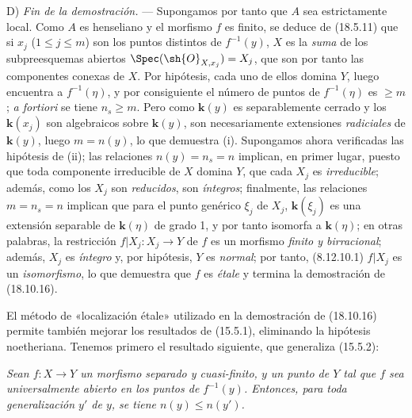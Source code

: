 D) \emph{Fin de la demostración.} --- Supongamos por tanto que $A$ sea estrictamente local. Como $A$ es henseliano y el morfismo $f$ es finito, se deduce de (18.5.11) que si $x_j$ ($1\leq j\leq m$) son los puntos distintos de $f^{-1}(y)$, $X$ es la \emph{suma} de los subpreesquemas abiertos $\Spec(\sh{O}_{X,x_j})=X_j$, que son por tanto las componentes conexas de $X$. Por hipótesis, cada uno de ellos domina $Y$, luego encuentra a $f^{-1}(\eta)$, y por consiguiente el número de puntos de $f^{-1}(\eta)$ es $\geq m$; \emph{a fortiori} se tiene $n_s\geq m$. Pero como $\boldsymbol k(y)$ es separablemente cerrado y los $\boldsymbol k(x_j)$ son algebraicos sobre $\boldsymbol k(y)$, son necesariamente extensiones \emph{radiciales} de $\boldsymbol k(y)$, luego $m=n(y)$, lo que demuestra (i). Supongamos ahora verificadas las hipótesis de (ii); las relaciones $n(y)=n_s=n$ implican, en primer lugar, puesto que toda componente irreducible de $X$ domina $Y$, que cada $X_j$ es \emph{irreducible}; además, como los $X_j$ son \emph{reducidos}, son \emph{íntegros}; finalmente, las relaciones $m=n_s=n$ implican que para el punto genérico $\xi_j$ de $X_j$, $\boldsymbol k(\xi_j)$ es una extensión separable de $\boldsymbol k(\eta)$ de grado 1, y por tanto isomorfa a $\boldsymbol k(\eta)$; en otras palabras, la restricción $f|X_j:X_j\to Y$ de $f$ es un morfismo \emph{finito y birracional}; además, $X_j$ es \emph{íntegro} y, por hipótesis, $Y$ es \emph{normal}; por tanto, (8.12.10.1) $f|X_j$ es un \emph{isomorfismo}, lo que demuestra que $f$ es \emph{étale} y termina la demostración de (18.10.16).

\begin{remark}[18.10.17]
\label{IV.18.10.17}
El método de «localización étale» utilizado en la demostración de (18.10.16) permite también mejorar los resultados de (15.5.1), eliminando la hipótesis noetheriana. Tenemos primero el resultado siguiente, que generaliza (15.5.2):
\end{remark}

\begin{env}[18.10.17.1]
\label{IV.18.10.17.1}
\emph{Sean $f:X\to Y$ un morfismo separado y cuasi-finito, $y$ un punto de $Y$ tal que $f$ sea universalmente abierto en los puntos de $f^{-1}(y)$. Entonces, para toda generalización $y'$ de $y$, se tiene $n(y)\leq n(y')$.}
\end{env}

